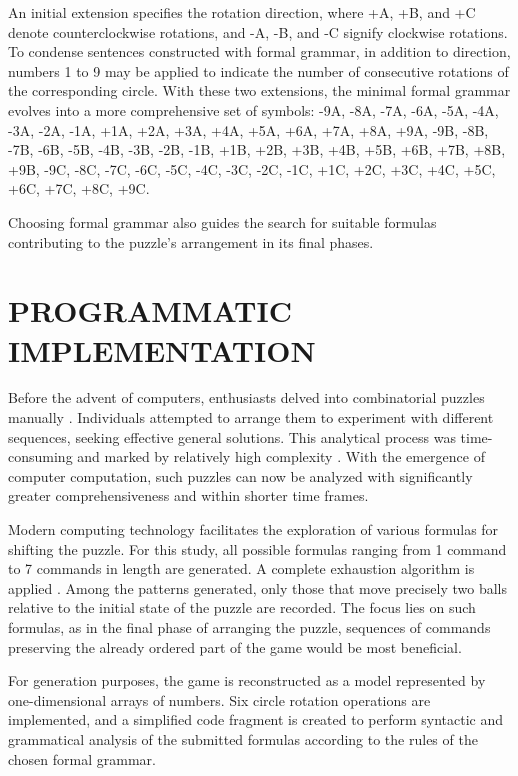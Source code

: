 \documentclass[a4paper,twocolumn,10pt]{article}
\begin{document}
An initial extension specifies the rotation direction, where +A, +B, and +C denote counterclockwise rotations, and -A, -B, and -C signify clockwise rotations. To condense sentences constructed with formal grammar, in addition to direction, numbers 1 to 9 may be applied to indicate the number of consecutive rotations of the corresponding circle. With these two extensions, the minimal formal grammar evolves into a more comprehensive set of symbols: -9A, -8A, -7A, -6A, -5A, -4A, -3A, -2A, -1A, +1A, +2A, +3A, +4A, +5A, +6A, +7A, +8A, +9A, -9B, -8B, -7B, -6B, -5B, -4B, -3B, -2B, -1B, +1B, +2B, +3B, +4B, +5B, +6B, +7B, +8B, +9B, -9C, -8C, -7C, -6C, -5C, -4C, -3C, -2C, -1C, +1C, +2C, +3C, +4C, +5C, +6C, +7C, +8C, +9C.

Choosing formal grammar also guides the search for suitable formulas contributing to the puzzle's arrangement in its final phases.

\section{PROGRAMMATIC IMPLEMENTATION}

Before the advent of computers, enthusiasts delved into combinatorial puzzles manually \cite{NIPS2016_fc490ca4}. Individuals attempted to arrange them to experiment with different sequences, seeking effective general solutions. This analytical process was time-consuming and marked by relatively high complexity  \cite{Archer2007}. With the emergence of computer computation, such puzzles can now be analyzed with significantly greater comprehensiveness and within shorter time frames.

Modern computing technology facilitates the exploration of various formulas for shifting the puzzle. For this study, all possible formulas ranging from 1 command to 7 commands in length are generated. A complete exhaustion algorithm is applied \cite{Balabanov2024a}. Among the patterns generated, only those that move precisely two balls relative to the initial state of the puzzle are recorded. The focus lies on such formulas, as in the final phase of arranging the puzzle, sequences of commands preserving the already ordered part of the game would be most beneficial.

For generation purposes, the game is reconstructed as a model represented by one-dimensional arrays of numbers. Six circle rotation operations are implemented, and a simplified code fragment is created to perform syntactic and grammatical analysis of the submitted formulas according to the rules of the chosen formal grammar.
\end{document}
